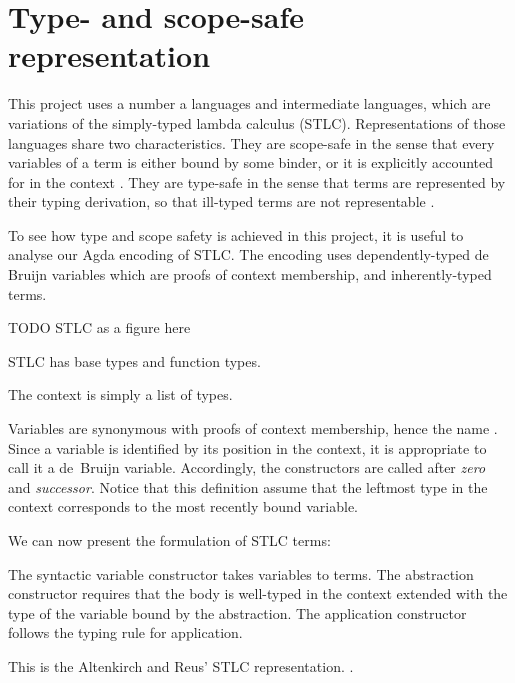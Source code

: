 \documentclass[bsc,frontabs,twoside,singlespacing,parskip,deptreport]{infthesis}
\theoremstyle{definition}
\begin{document}
\section{Type- and scope-safe representation}

This project uses a number a languages and intermediate languages,
which are variations of the simply-typed lambda calculus
(STLC). Representations of those languages share two
characteristics. They are scope-safe in the sense that every variables
of a term is either bound by some binder, or it is explicitly
accounted for in the context \cite{DBLP:journals/pacmpl/AllaisA0MM18}.
They are type-safe in the sense that terms are represented by their
typing derivation, so that ill-typed terms are not representable
\cite{DBLP:conf/pldi/Chlipala07}.

To see how type and scope safety is achieved in this project, it is
useful to analyse our Agda encoding of STLC. The encoding uses
dependently-typed de Bruijn variables which are proofs of context
membership, and inherently-typed terms.

TODO STLC as a figure here

STLC has base types and function types.


The context is simply a list of types.


Variables are synonymous with proofs of context membership, hence the
name . Since a variable is identified by its position in
the context, it is appropriate to call it a de~Bruijn
variable. Accordingly, the  constructors are called after
\textit{zero} and \textit{successor}. Notice that this definition
assume that the leftmost type in the context corresponds to the most
recently bound variable.


We can now present the formulation of STLC terms:


The syntactic variable  constructor takes variables to
terms. The abstraction constructor  requires that the body is
well-typed in the context  extended with the type  of the
variable bound by the abstraction. The application constructor
 follows the typing rule for application.

This is the Altenkirch and Reus' STLC
representation. \cite{DBLP:conf/csl/AltenkirchR99}.
\end{document}

